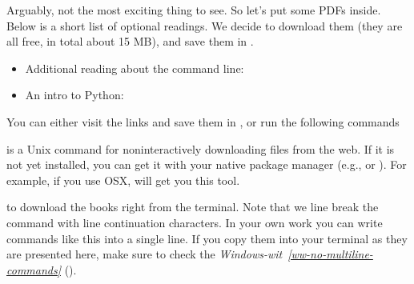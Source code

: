\sphinxAtStartPar
Arguably, not the most exciting thing to see. So let’s put some PDFs inside.
Below is a short list of optional readings. We decide to download them (they
are all free, in total about 15 MB), and save them in .
\begin{itemize}
\item {} 
\sphinxAtStartPar
Additional reading about the command line: 

\item {} 
\sphinxAtStartPar
An intro to Python: 

\end{itemize}

\sphinxAtStartPar
You can either visit the links and save them in ,
or run the following commands%
\begin{footnote}\sphinxAtStartFootnote
{} is a Unix command for non\sphinxhyphen{}interactively downloading files from the
web. If it is not yet installed, you can get it with your native package manager (e.g.,
 or ). For example, if you use OSX, 
will get you this tool.
%
\end{footnote} to download the books right from the terminal.
Note that we line break the command with \sphinxcode{\sphinxupquote{\textbackslash{}}} line continuation characters. In your own work you can write
commands like this into a single line. If you copy them into your terminal as they
are presented here, make sure to check the \textit{Windows-wit}~{\windowswiticoninline}\textit{\ref{ww-no-multiline-commands}} {\hyperref[\detokenize{basics/101-102-populate:ww-no-multiline-commands}]{}} ().


